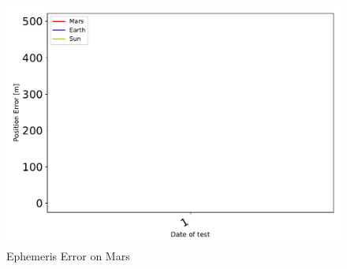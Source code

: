 \begin{figure}[htbp]\centerline{\includegraphics[height=0.7\textwidth, keepaspectratio]{AutoTeX/EphemMars}}\caption{Ephemeris Error on Mars}\label{fig:EphemMars}\end{figure}